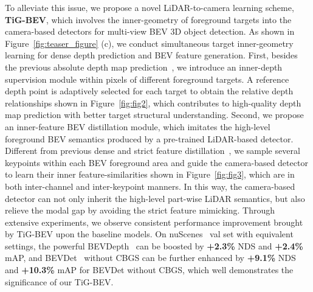 To alleviate this issue, we propose a novel LiDAR-to-camera learning scheme, \textbf{TiG-BEV}, which involves the inner-geometry of foreground targets into the camera-based detectors for multi-view BEV 3D object detection. As shown in Figure~\ref{fig:teaser_figure} (c), we conduct simultaneous target inner-geometry learning for dense depth prediction and BEV feature generation.
First, besides the previous absolute depth map prediction~\cite{b7,b51}, we introduce an inner-depth supervision module within pixels of different foreground targets. A reference depth point is adaptively selected for each target to obtain the relative depth relationships shown in Figure~\ref{fig:fig2}, which contributes to high-quality depth map prediction with better target structural understanding. Second, we propose an inner-feature BEV distillation module, which imitates the high-level foreground BEV semantics produced by a pre-trained LiDAR-based detector. Different from previous dense and strict feature distillation~\cite{b9,b52}, we sample several keypoints within each BEV foreground area and guide the camera-based detector to learn their inner feature-similarities shown in Figure~\ref{fig:fig3}, which are in both inter-channel and inter-keypoint manners. In this way, the camera-based detector can not only inherit the high-level part-wise LiDAR semantics, but also relieve the modal gap by avoiding the strict feature mimicking. Through extensive experiments, we observe consistent performance improvement brought by TiG-BEV upon the baseline models. On nuScenes~\cite{b6} val set with equivalent settings, the powerful BEVDepth~\cite{b7} can be boosted by \textbf{+2.3\%} NDS and \textbf{+2.4\%} mAP, and BEVDet~\cite{b19} without CBGS can be further enhanced by \textbf{+9.1\%} NDS and \textbf{+10.3\%} mAP for BEVDet without CBGS, which well demonstrates the significance of our TiG-BEV.


